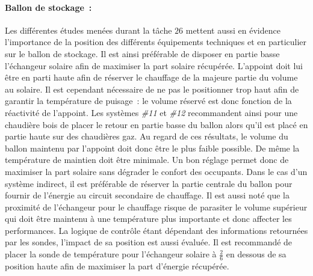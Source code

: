 \paragraph{Ballon de stockage~:} %
\label{par:ballon_de_stockage}
Les différentes études menées durant la tâche $26$ mettent aussi en évidence l’importance
de la position des différents équipements techniques et en particulier sur le ballon
de stockage. Il est ainsi préférable de disposer en partie basse l’échangeur solaire
afin de maximiser la part solaire récupérée. L’appoint doit lui être en parti haute afin de réserver
le chauffage de la majeure partie du volume au solaire. Il est cependant nécessaire
de ne pas le positionner trop haut afin de garantir la température de puisage~: le volume
réservé est donc fonction de la réactivité de l’appoint. Les systèmes \emph{\#11} et
\emph{\#12} recommandent ainsi pour une chaudière bois de placer le retour en partie
basse du ballon alors qu’il est placé en partie haute sur des chaudières gaz.
Au regard de ces résultats, le volume du ballon maintenu par l’appoint doit donc
être le plus faible possible. De même la température de maintien doit être minimale.
Un bon réglage permet donc de maximiser la part solaire sans dégrader le confort des occupants.
Dans le cas d’un système indirect, il est préférable de réserver la partie centrale
du ballon
pour fournir de l’énergie au circuit secondaire de chauffage. Il est aussi noté que
la proximité de l’échangeur pour le chauffage risque de parasiter le volume supérieur
qui doit être maintenu à une température plus importante et donc affecter les performances.
La logique de contrôle étant dépendant des informations retournées par les sondes,
l’impact de sa position est aussi évaluée. Il est recommandé de placer la sonde
de température pour l’échangeur solaire à $\frac{2}{6}$ en dessous de sa position haute
afin de maximiser la part d’énergie récupérée.

